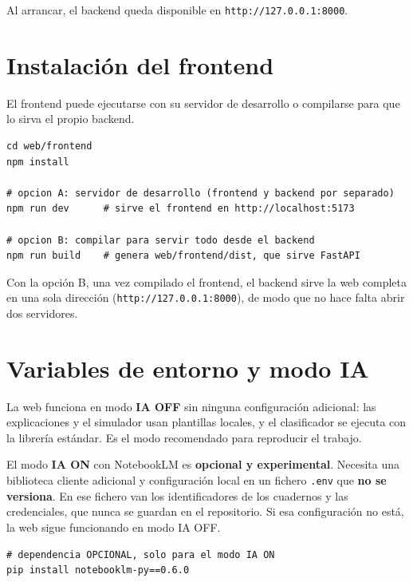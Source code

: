 Al arrancar, el backend queda disponible en \texttt{http://127.0.0.1:8000}.

\section{Instalación del frontend}
\label{sec:apb_frontend}

El frontend puede ejecutarse con su servidor de desarrollo o compilarse para que lo sirva el propio backend.

\begin{small}
\begin{verbatim}
cd web/frontend
npm install

# opcion A: servidor de desarrollo (frontend y backend por separado)
npm run dev      # sirve el frontend en http://localhost:5173

# opcion B: compilar para servir todo desde el backend
npm run build    # genera web/frontend/dist, que sirve FastAPI
\end{verbatim}
\end{small}

Con la opción B, una vez compilado el frontend, el backend sirve la web completa en una sola dirección (\texttt{http://127.0.0.1:8000}), de modo que no hace falta abrir dos servidores.

\section{Variables de entorno y modo IA}
\label{sec:apb_ia}

La web funciona en modo \textbf{IA OFF} sin ninguna configuración adicional: las explicaciones y el simulador usan plantillas locales, y el clasificador se ejecuta con la librería estándar. Es el modo recomendado para reproducir el trabajo.

El modo \textbf{IA ON} con NotebookLM es \textbf{opcional y experimental}. Necesita una biblioteca cliente adicional y configuración local en un fichero \texttt{.env} que \textbf{no se versiona}. En ese fichero van los identificadores de los cuadernos y las credenciales, que nunca se guardan en el repositorio. Si esa configuración no está, la web sigue funcionando en modo IA OFF.

\begin{small}
\begin{verbatim}
# dependencia OPCIONAL, solo para el modo IA ON
pip install notebooklm-py==0.6.0
\end{verbatim}
\end{small}

